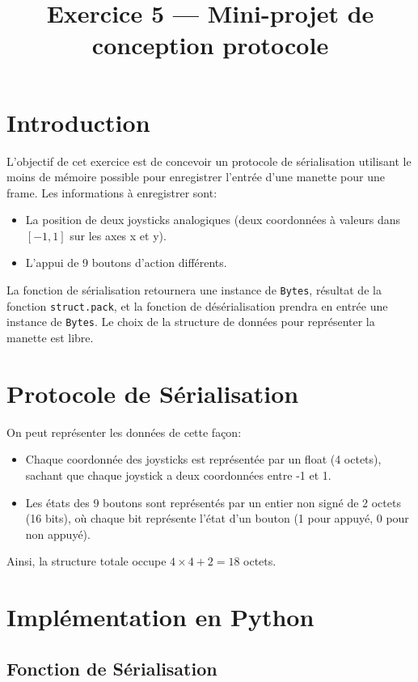 \documentclass{article}
\title{Exercice 5 — Mini-projet de conception protocole}
\author{}
\date{}
\begin{document}
\maketitle

\section{Introduction}

L'objectif de cet exercice est de concevoir un protocole de sérialisation utilisant le moins de mémoire possible pour enregistrer l'entrée d'une manette pour une frame. Les informations à enregistrer sont:
\begin{itemize}
    \item La position de deux joysticks analogiques (deux coordonnées à valeurs dans $[-1, 1]$ sur les axes x et y).
    \item L'appui de 9 boutons d'action différents.
\end{itemize}

La fonction de sérialisation retournera une instance de \texttt{Bytes}, résultat de la fonction \texttt{struct.pack}, et la fonction de désérialisation prendra en entrée une instance de \texttt{Bytes}. Le choix de la structure de données pour représenter la manette est libre.

\section{Protocole de Sérialisation}

On peut représenter les données de cette façon:
\begin{itemize}
    \item Chaque coordonnée des joysticks est représentée par un float (4 octets), sachant que chaque joystick a deux coordonnées entre -1 et 1.
    \item Les états des 9 boutons sont représentés par un entier non signé de 2 octets (16 bits), où chaque bit représente l'état d'un bouton (1 pour appuyé, 0 pour non appuyé).
\end{itemize}

Ainsi, la structure totale occupe $4 \times 4 + 2 = 18$ octets.

\section{Implémentation en Python}

\subsection{Fonction de Sérialisation}
\end{document}
